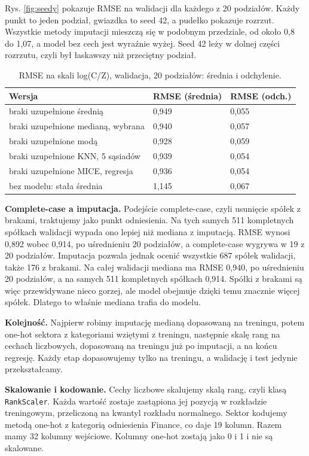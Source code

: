 ﻿\documentclass[10pt,twocolumn,a4paper]{article}
\begin{document}
Rys. \ref{fig:seedy} pokazuje RMSE na walidacji dla każdego z 20 podziałów. Każdy punkt to jeden podział, gwiazdka to seed 42, a pudełko pokazuje rozrzut. Wszystkie metody imputacji mieszczą się w podobnym przedziale, od około 0,8 do 1,07, a model bez cech jest wyraźnie wyżej. Seed 42 leży w dolnej części rozrzutu, czyli był łaskawszy niż przeciętny podział.

\begin{table}[H]
\centering
\caption{RMSE na skali log(C/Z), walidacja, 20 podziałów: średnia i odchylenie.}
\label{tab:walidacja}
\footnotesize
\begin{tabularx}{\columnwidth}{@{}lYY@{}}
\toprule
Wersja & RMSE (średnia) & RMSE (odch.)\\
\midrule
braki uzupełnione średnią & 0,949 & 0,055\\
braki uzupełnione medianą, wybrana & 0,940 & 0,057\\
braki uzupełnione modą & 0,928 & 0,059\\
braki uzupełnione KNN, 5 sąsiadów & 0,939 & 0,054\\
braki uzupełnione MICE, regresja & 0,936 & 0,054\\
bez modelu: stała średnia & 1,145 & 0,067\\
\bottomrule
\end{tabularx}
\end{table}

\textbf{Complete-case a imputacja.} Podejście complete-case, czyli usunięcie spółek z brakami, traktujemy jako punkt odniesienia. Na tych samych 511 kompletnych spółkach walidacji wypada ono lepiej niż mediana z imputacją. RMSE wynosi 0,892 wobec 0,914, po uśrednieniu 20 podziałów, a complete-case wygrywa w 19 z 20 podziałów. Imputacja pozwala jednak ocenić wszystkie 687 spółek walidacji, także 176 z brakami. Na całej walidacji mediana ma RMSE 0,940, po uśrednieniu 20 podziałów, a na samych 511 kompletnych spółkach 0,914. Spółki z brakami są więc przewidywane nieco gorzej, ale model obejmuje dzięki temu znacznie więcej spółek. Dlatego to właśnie mediana trafia do modelu.

\textbf{Kolejność.} Najpierw robimy imputację medianą dopasowaną na treningu, potem one-hot sektora z kategoriami wziętymi z treningu, następnie skalę rang na cechach liczbowych, dopasowaną na treningu już po imputacji, a na końcu regresję. Każdy etap dopasowujemy tylko na treningu, a walidację i test jedynie przekształcamy.

\textbf{Skalowanie i kodowanie.} Cechy liczbowe skalujemy skalą rang, czyli klasą \texttt{RankScaler}. Każda wartość zostaje zastąpiona jej pozycją w rozkładzie treningowym, przeliczoną na kwantyl rozkładu normalnego. Sektor kodujemy metodą one-hot z kategorią odniesienia Finance, co daje 19 kolumn. Razem mamy 32 kolumny wejściowe. Kolumny one-hot zostają jako 0 i 1 i nie są skalowane.
\end{document}
